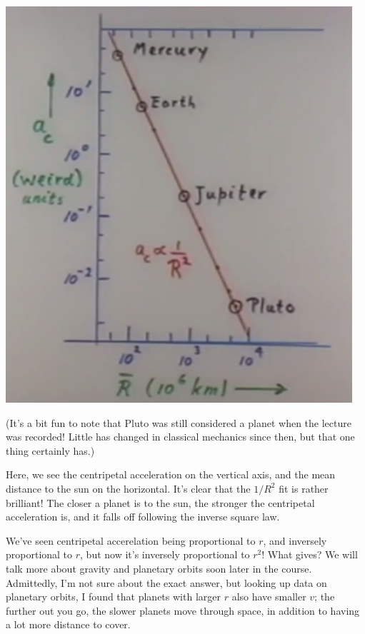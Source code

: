 \documentclass[12pt,a4paper]{report}
\begin{document}
\begin{center}
\includegraphics[scale=0.5]{Graphics/lec5_gravity_inverse_r2}
\end{center}

(It's a bit fun to note that Pluto was still considered a planet when the lecture was recorded! Little has changed in classical mechanics since then, but that one thing certainly has.)

Here, we see the centripetal acceleration on the vertical axis, and the mean distance to the sun on the horizontal. It's clear that the $1/R^2$ fit is rather brilliant! The closer a planet is to the sun, the stronger the centripetal acceleration is, and it falls off following the inverse square law.

We've seen centripetal accerelation being proportional to $r$, and inversely proportional to $r$, but now it's inversely proportional to $r^2$! What gives? We will talk more about gravity and planetary orbits soon later in the course. Admittedly, I'm not sure about the exact answer, but looking up data on planetary orbits, I found that planets with larger $r$ also have smaller $v$; the further out you go, the slower planets move through space, in addition to having a lot more distance to cover.
\end{document}
